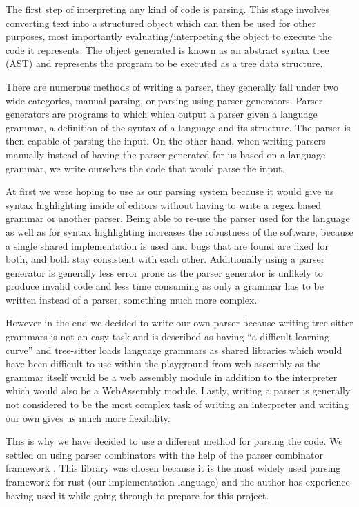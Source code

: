 \documentclass{article}
\begin{document}
The first step of interpreting any kind of code is parsing. This stage involves
converting text into a structured object which can then be used for other
purposes, most importantly evaluating/interpreting the object to execute the
code it represents. The object generated is known as an abstract syntax tree
(AST) and represents the program to be executed as a tree data structure.

There are numerous methods of writing a parser, they generally fall under two
wide categories, manual parsing, or parsing using parser generators. Parser
generators are programs to which which output a parser given a language
grammar, a definition of the syntax of a language and its structure. The parser
is then capable of parsing the input. On the other hand, when writing parsers
manually instead of having the parser generated for us based on a language
grammar, we write ourselves the code that would parse the input.

At first we were hoping to use  as our parsing system
because it would give us syntax highlighting inside of editors without having
to write a regex based grammar or another parser. Being able to re-use the
parser used for the language as well as for syntax highlighting increases the
robustness of the software, because a single shared implementation is used and
bugs that are found are fixed for both, and both stay consistent with each
other. Additionally using a parser generator is generally less error prone as
the parser generator is unlikely to produce invalid code and less time
consuming as only a grammar has to be written instead of a parser, something
much more complex.

However in the end we decided to write our own parser because writing
tree-sitter grammars is not an easy task and is described as having ``a
difficult learning curve''\cite{ts_creating_parsers} and tree-sitter loads
language grammars as shared libraries which would have been difficult to use
within the playground from web assembly as the grammar itself would be a web
assembly module in addition to the interpreter which would also be a
WebAssembly module. Lastly, writing a parser is generally not considered to be
the most complex task of writing an interpreter and writing our own gives us
much more flexibility.

This is why we have decided to use a different method for parsing the code. We
settled on using parser combinators with the help of the parser combinator
framework . This library was chosen because it is the most widely
used parsing framework for rust (our implementation language) and the author
has experience having used it while going through \textcite{eopl} to prepare
for this project.
\end{document}
